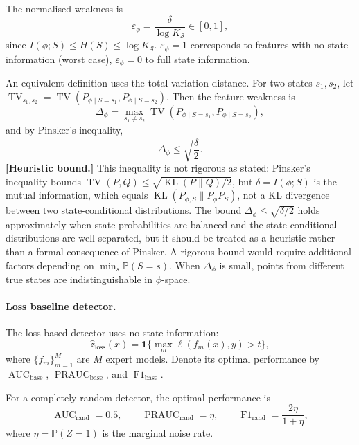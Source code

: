 The normalised weakness is
\begin{equation}
\varepsilon_\phi = \frac{\delta}{\log K_{\mathcal{S}}} \in [0, 1],
\label{eq:norm-weakness}
\end{equation}
since $I(\phi; S) \leq H(S) \leq \log K_{\mathcal{S}}$.
$\varepsilon_\phi = 1$ corresponds to features with no state information
(worst case), $\varepsilon_\phi = 0$ to full state information.

An equivalent definition uses the total variation distance. For two states
$s_1, s_2$, let
$\operatorname{TV}_{s_1,s_2} = \operatorname{TV}(P_{\phi \mid S=s_1},
P_{\phi \mid S=s_2})$. Then the feature weakness is
\begin{equation}
\Delta_\phi = \max_{s_1 \neq s_2}
\operatorname{TV}(P_{\phi \mid S=s_1}, P_{\phi \mid S=s_2}),
\label{eq:tv-weakness}
\end{equation}
and by Pinsker's inequality,
\begin{equation}
\Delta_\phi \leq \sqrt{\frac{\delta}{2}}.
\label{eq:pinsker-tv}
\end{equation}
\textbf{[Heuristic bound.]} This inequality is not rigorous as stated:
Pinsker's inequality bounds $\operatorname{TV}(P,Q) \leq \sqrt{\operatorname{KL}(P\|Q)/2}$,
but $\delta = I(\phi;S)$ is the mutual information, which equals
$\operatorname{KL}(P_{\phi,S}\|P_\phi P_S)$, not a KL divergence between two
state-conditional distributions. The bound $\Delta_\phi \leq \sqrt{\delta/2}$
holds approximately when state probabilities are balanced and the
state-conditional distributions are well-separated, but it should be treated
as a heuristic rather than a formal consequence of Pinsker. A rigorous
bound would require additional factors depending on $\min_s \mathbb{P}(S=s)$.
When $\Delta_\phi$ is small, points from different true states are
indistinguishable in $\phi$-space.

\paragraph{Loss baseline detector.}
The loss-based detector uses no state information:
\[
\hat{z}_{\text{loss}}(x) = \mathbf{1}\{\max_m \ell(f_m(x), y) > t\},
\]
where $\{f_m\}_{m=1}^M$ are $M$ expert models. Denote its optimal performance
by $\operatorname{AUC}_{\text{base}}$,
$\operatorname{PRAUC}_{\text{base}}$, and $\operatorname{F1}_{\text{base}}$.

For a completely random detector, the optimal performance is
\begin{equation}
\operatorname{AUC}_{\text{rand}} = 0.5,\qquad
\operatorname{PRAUC}_{\text{rand}} = \eta,\qquad
\operatorname{F1}_{\text{rand}} = \frac{2\eta}{1+\eta},
\label{eq:random-baseline}
\end{equation}
where $\eta = \mathbb{P}(Z=1)$ is the marginal noise rate.

